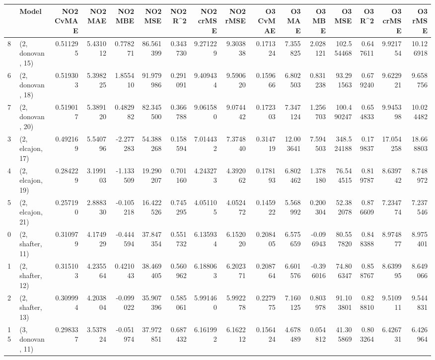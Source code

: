 \begin{tabular}{llrrrrrrrrrrrrrr}
\toprule
{} &             Model &  NO2 CvMAE &   NO2 MAE &   NO2 MBE &    NO2 MSE &   NO2 R\textasciicircum2 &  NO2 crMSE &  NO2 rMSE &  O3 CvMAE &     O3 MAE &    O3 MBE &      O3 MSE &    O3 R\textasciicircum2 &   O3 crMSE &    O3 rMSE \\
\midrule
8  &  (2, donovan, 15) &   0.511295 &  5.431012 &  0.778271 &  86.561399 &  0.343730 &   9.271229 &  9.303838 &  0.171324 &   7.355825 &  2.028121 &  102.554468 &  0.647611 &   9.921754 &  10.126918 \\
6  &  (2, donovan, 18) &   0.519303 &  5.398225 &  1.855410 &  91.979986 &  0.291091 &   9.409434 &  9.590620 &  0.159666 &   6.802503 &  0.831238 &   93.291563 &  0.679240 &   9.622921 &   9.658756 \\
7  &  (2, donovan, 20) &   0.519017 &  5.389120 &  0.482982 &  82.345500 &  0.366788 &   9.061580 &  9.074442 &  0.172303 &   7.347124 &  1.256703 &  100.490247 &  0.654833 &   9.945398 &  10.024482 \\
3  &  (2, elcajon, 17) &   0.492169 &  5.540796 & -2.277283 &  54.388268 &  0.158594 &   7.014432 &  7.374840 &  0.314719 &  12.003641 &  7.594503 &  348.524188 &  0.179837 &  17.054258 &  18.668803 \\
4  &  (2, elcajon, 19) &   0.284229 &  3.199103 & -1.133509 &  19.290207 &  0.701160 &   4.243273 &  4.392062 &  0.178193 &   6.802462 &  1.378180 &   76.544515 &  0.819787 &   8.639742 &   8.748972 \\
5  &  (2, elcajon, 21) &   0.257190 &  2.888330 & -0.105218 &  16.422526 &  0.745295 &   4.051105 &  4.052472 &  0.145922 &   5.568992 &  0.200304 &   52.382078 &  0.876609 &   7.234774 &   7.237546 \\
0  &  (2, shafter, 11) &   0.310979 &  4.174929 & -0.444594 &  37.847354 &  0.551732 &   6.135934 &  6.152020 &  0.208405 &   6.575659 & -0.096943 &   80.557820 &  0.848388 &   8.974877 &   8.975401 \\
1  &  (2, shafter, 12) &   0.315103 &  4.235564 &  0.421043 &  38.469405 &  0.560962 &   6.188063 &  6.202371 &  0.208764 &   6.601576 & -0.396016 &   74.806347 &  0.858767 &   8.639995 &   8.649066 \\
2  &  (2, shafter, 13) &   0.309994 &  4.203804 & -0.099022 &  35.907396 &  0.585061 &   5.991460 &  5.992278 &  0.227975 &   7.160125 &  0.803978 &   91.103801 &  0.828810 &   9.510911 &   9.544831 \\
15 &  (3, donovan, 11) &   0.298337 &  3.537824 & -0.051974 &  37.972851 &  0.687432 &   6.161992 &  6.162212 &  0.156424 &   4.678489 &  0.054812 &   41.305869 &  0.803264 &   6.426731 &   6.426964 \\

\end{tabular}
